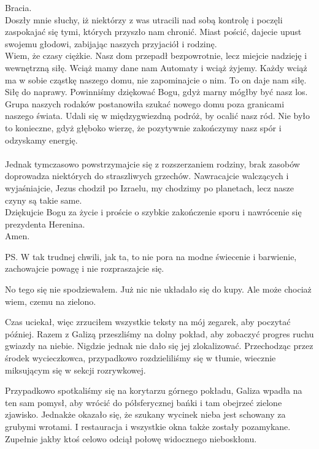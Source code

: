 \begin{poem}
	Bracia. \\
	Doszły mnie słuchy, iż niektórzy z was utracili nad sobą kontrolę i poczęli zaspokajać się tymi, których przyszło nam chronić.
	Miast pościć, dajecie upust swojemu głodowi, zabijając naszych przyjaciół i rodzinę. \\
	Wiem, że czasy ciężkie. Nasz dom przepadł bezpowrotnie, lecz miejcie nadzieję i wewnętrzną siłę.
	Wciąż mamy dane nam Automaty i wciąż żyjemy.
	Każdy wciąż ma w sobie cząstkę naszego domu, nie zapominajcie o nim. To on daje nam siłę. Siłę do naprawy.
	Powinniśmy dziękować Bogu, gdyż marny mógłby być nasz los.
	\\
	Grupa naszych rodaków postanowiła szukać nowego domu poza granicami naszego świata. Udali się w międzygwiezdną podróż, by ocalić nasz ród.
	Nie było to konieczne, gdyż głęboko wierzę, że pozytywnie zakończymy nasz spór i odzyskamy energię. \\
	\\
	Jednak tymczasowo powstrzymajcie się z rozszerzaniem rodziny, brak zasobów doprowadza niektórych do straszliwych grzechów.
	Nawracajcie walczących i wyjaśniajcie, Jezus chodził po Izraelu, my chodzimy po planetach, lecz nasze czyny są takie same.
	\\
	Dziękujcie Bogu za życie i proście o szybkie zakończenie sporu i nawrócenie się prezydenta Herenina. \\
	Amen.
	
	PS. W tak trudnej chwili, jak ta, to nie pora na modne świecenie i barwienie, zachowajcie powagę i nie rozpraszajcie się.
\end{poem}

No tego się nie spodziewałem.
Już nic nie układało się do kupy.
Ale może chociaż wiem, czemu na zielono.

Czas uciekał, więc zrzuciłem wszystkie teksty na mój zegarek, aby poczytać później.
Razem z Galizą przeszliśmy na dolny pokład, aby zobaczyć progres ruchu gwiazdy na niebie.
Nigdzie jednak nie dało się jej zlokalizować.
Przechodząc przez środek wycieczkowca, przypadkowo rozdzieliliśmy się w tłumie, wiecznie miksującym się w sekcji rozrywkowej.

Przypadkowo spotkaliśmy się na korytarzu górnego pokładu, Galiza wpadła na ten sam pomysł, aby wrócić do półsferycznej bańki i tam obejrzeć zielone zjawisko.
Jednakże okazało się, że szukany wycinek nieba jest schowany za grubymi wrotami.
I restauracja i wszystkie okna także zostały pozamykane.
Zupełnie jakby ktoś celowo odciął połowę widocznego nieboskłonu.

